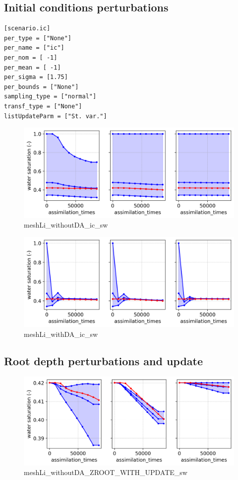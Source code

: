 \documentclass{article}
\begin{document}
\subsection{Initial conditions perturbations}

\begin{verbatim}
[scenario.ic]
per_type = ["None"]
per_name = ["ic"]
per_nom = [ -1]
per_mean = [ -1]
per_sigma = [1.75]
per_bounds = ["None"]
sampling_type = ["normal"]
transf_type = ["None"]
listUpdateParm = ["St. var."]
\end{verbatim}

\begin{figure}[!htbp]
\centering
\includegraphics[width=0.75\linewidth]{files/meshLi_withoutDA_ic_-3288cd0f84d52e9dc3649e5deb9ae837.png}
\caption[]{meshLi\_withoutDA\_ic\_sw}
\label{meshLi_withoutDA_ic_sw}
\end{figure}

\begin{figure}[!htbp]
\centering
\includegraphics[width=0.75\linewidth]{files/meshLi_withDA_ic_sw-c3ce6044a7767982dea7f9f70b94f4fb.png}
\caption[]{meshLi\_withDA\_ic\_sw}
\label{meshLi_withDA_ic_sw}
\end{figure}

\subsection{Root depth perturbations and update}

\begin{figure}[!htbp]
\centering
\includegraphics[width=0.75\linewidth]{files/meshLi_withoutDA_ZRO-a10db030e89a1da4fbac99c3d1316f71.png}
\caption[]{meshLi\_withoutDA\_ZROOT\_WITH\_UPDATE\_sw}
\label{meshLi_withoutDA_ZROOT_WITH_UPDATE_sw}
\end{figure}
\end{document}
